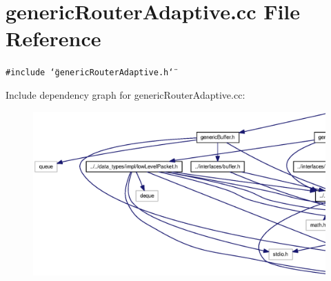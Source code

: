 \section{genericRouterAdaptive.cc File Reference}
\label{genericRouterAdaptive_8cc}
{\tt \#include \char`\"{}genericRouterAdaptive.h\char`\"{}}\par


Include dependency graph for genericRouterAdaptive.cc:\nopagebreak
\begin{figure}[H]
\begin{center}
\leavevmode
\includegraphics[width=420pt]{genericRouterAdaptive_8cc__incl}
\end{center}
\end{figure}
